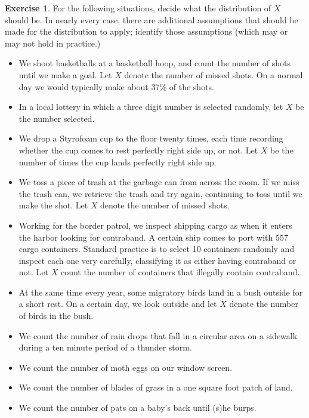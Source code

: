 \documentclass[]{book}
\providecommand{\tightlist}{%
  \setlength{\itemsep}{0pt}\setlength{\parskip}{0pt}}
\numberwithin{equation}{chapter}
\numberwithin{figure}{chapter}
\theoremstyle{plain}
\theoremstyle{definition}
\newtheorem{xca}{Exercise}[chapter]
\theoremstyle{remark}
\theoremstyle{definition}
\theoremstyle{definition}
\theoremstyle{remark}
\begin{document}
\begin{xca}
For the following situations, decide what the distribution of \(X\)
should be. In nearly every case, there are additional assumptions that
should be made for the distribution to apply; identify those assumptions
(which may or may not hold in practice.)

\begin{itemize}
\tightlist
\item
  We shoot basketballs at a basketball hoop, and count the number of
  shots until we make a goal. Let \(X\) denote the number of missed
  shots. On a normal day we would typically make about 37\% of the
  shots.
\item
  In a local lottery in which a three digit number is selected randomly,
  let \(X\) be the number selected.
\item
  We drop a Styrofoam cup to the floor twenty times, each time recording
  whether the cup comes to rest perfectly right side up, or not. Let
  \(X\) be the number of times the cup lands perfectly right side up.
\item
  We toss a piece of trash at the garbage can from across the room. If
  we miss the trash can, we retrieve the trash and try again, continuing
  to toss until we make the shot. Let \(X\) denote the number of missed
  shots.
\item
  Working for the border patrol, we inspect shipping cargo as when it
  enters the harbor looking for contraband. A certain ship comes to port
  with 557 cargo containers. Standard practice is to select 10
  containers randomly and inspect each one very carefully, classifying
  it as either having contraband or not. Let \(X\) count the number of
  containers that illegally contain contraband.
\item
  At the same time every year, some migratory birds land in a bush
  outside for a short rest. On a certain day, we look outside and let
  \(X\) denote the number of birds in the bush.
\item
  We count the number of rain drops that fall in a circular area on a
  sidewalk during a ten minute period of a thunder storm.
\item
  We count the number of moth eggs on our window screen.
\item
  We count the number of blades of grass in a one square foot patch of
  land.
\item
  We count the number of pats on a baby's back until (s)he burps.
\end{itemize}
\end{xca}
\end{document}
